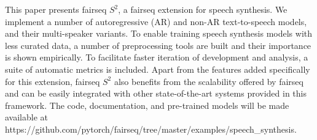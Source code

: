 This paper presents fairseq $S^2$, a fairseq extension for speech synthesis. We implement a number of autoregressive (AR) and non-AR text-to-speech models, and their multi-speaker variants. To enable training speech synthesis models with less curated data, a number of preprocessing tools are built and their importance is shown empirically. To facilitate faster iteration of development and analysis, a suite of automatic metrics is included. Apart from the features added specifically for this extension, fairseq $S^2$ also benefits from the scalability offered by fairseq and can be easily integrated with other state-of-the-art systems provided in this framework. The code, documentation, and pre-trained models will be made available at https://github.com/pytorch/fairseq/tree/master/examples/speech_synthesis.